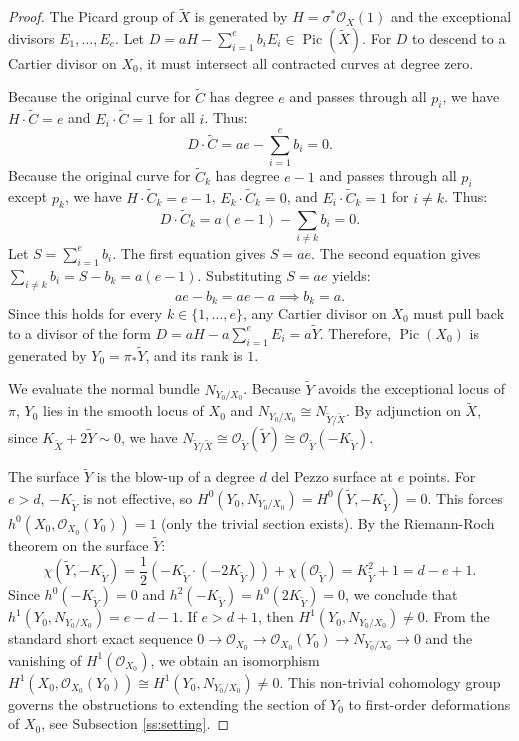 \documentclass[11pt]{article}
\theoremstyle{definition}
\newcommand{\OO}{\mathcal{O}}
\DeclareMathOperator{\Pic}{Pic}
\begin{document}
\begin{proof}
The Picard group of $\tilde{X}$ is generated by $H = \sigma^*\OO_X(1)$ and the exceptional divisors $E_1, \dots, E_e$. Let $D = aH - \sum_{i=1}^e b_i E_i \in \Pic(\tilde{X})$. For $D$ to descend to a Cartier divisor on $X_0$, it must intersect all contracted curves at degree zero. 

Because the original curve for $\tilde{C}$ has degree $e$ and passes through all $p_i$, we have $H \cdot \tilde{C} = e$ and $E_i \cdot \tilde{C} = 1$ for all $i$. Thus:
\[
D \cdot \tilde{C} = ae - \sum_{i=1}^e b_i = 0.
\]
Because the original curve for $\tilde{C}_k$ has degree $e-1$ and passes through all $p_i$ except $p_k$, we have $H \cdot \tilde{C}_k = e-1$, $E_k \cdot \tilde{C}_k = 0$, and $E_i \cdot \tilde{C}_k = 1$ for $i \neq k$. Thus:
\[
D \cdot \tilde{C}_k = a(e-1) - \sum_{i \neq k} b_i = 0.
\]
Let $S = \sum_{i=1}^e b_i$. The first equation gives $S = ae$. The second equation gives $\sum_{i \neq k} b_i = S - b_k = a(e-1)$. Substituting $S = ae$ yields:
\[
ae - b_k = ae - a \implies b_k = a.
\]
Since this holds for every $k \in \{1, \dots, e\}$, any Cartier divisor on $X_0$ must pull back to a divisor of the form $D = aH - a \sum_{i=1}^e E_i = a\tilde{Y}$. Therefore, $\Pic(X_0)$ is generated by $Y_0 = \pi_*\tilde{Y}$, and its rank is $1$.

\vspace{0.5em}
We evaluate the normal bundle $N_{Y_0/X_0}$. Because $\tilde{Y}$ avoids the exceptional locus of $\pi$, $Y_0$ lies in the smooth locus of $X_0$ and $N_{Y_0/X_0} \cong N_{\tilde{Y}/\tilde{X}}$. By adjunction on $\tilde{X}$, since $K_{\tilde{X}} + 2\tilde{Y} \sim 0$, we have $N_{\tilde{Y}/\tilde{X}} \cong \OO_{\tilde{Y}}(\tilde{Y}) \cong \OO_{\tilde{Y}}(-K_{\tilde{Y}})$.

The surface $\tilde{Y}$ is the blow-up of a degree $d$ del Pezzo surface at $e$ points. For $e > d$, $-K_{\tilde{Y}}$ is not effective, so $H^0(Y_0, N_{Y_0/X_0}) = H^0(\tilde{Y}, -K_{\tilde{Y}}) = 0$. This forces $h^0(X_0, \OO_{X_0}(Y_0)) = 1$ (only the trivial section exists). 
By the Riemann-Roch theorem on the surface $\tilde{Y}$:
\[
\chi(\tilde{Y}, -K_{\tilde{Y}}) = \frac{1}{2}(-K_{\tilde{Y}} \cdot (-2K_{\tilde{Y}})) + \chi(\OO_{\tilde{Y}}) = K_{\tilde{Y}}^2 + 1 = d - e + 1.
\]
Since $h^0(-K_{\tilde{Y}}) = 0$ and $h^2(-K_{\tilde{Y}}) = h^0(2K_{\tilde{Y}}) = 0$, we conclude that $h^1(Y_0, N_{Y_0/X_0}) = e - d - 1$. If $e > d + 1$, then $H^1(Y_0, N_{Y_0/X_0}) \neq 0$. 
From the standard short exact sequence $0 \to \OO_{X_0} \to \OO_{X_0}(Y_0) \to N_{Y_0/X_0} \to 0$ and the vanishing of $H^1(\OO_{X_0})$, we obtain an isomorphism $H^1(X_0, \OO_{X_0}(Y_0)) \cong H^1(Y_0, N_{Y_0/X_0}) \neq 0$. This non-trivial cohomology group governs the obstructions to extending the section of $Y_0$ to first-order deformations of $X_0$, see Subsection \ref{ss:setting}.


\end{proof}
\end{document}

